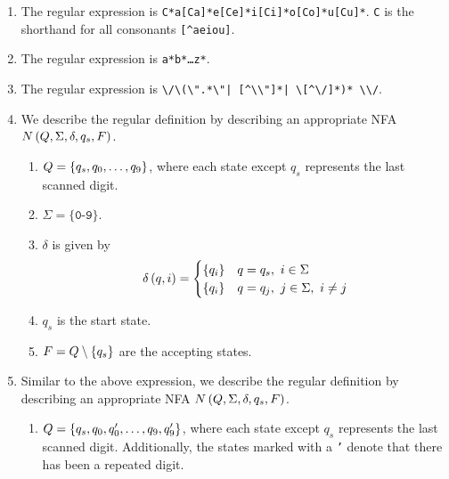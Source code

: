 \begin{solution}\label{sol:030305}
    \begin{enumerate}[label=\alph*)]
        \item The regular expression is \texttt{C*a[Ca]*e[Ce]*i[Ci]*o[Co]*u[Cu]*}.
        \texttt{C} is the shorthand for all consonants \texttt{[\^{}aeiou]}.
        \item The regular expression is \texttt{a*b*\dots z*}.
        \item The regular expression is \texttt{\textbackslash/\textbackslash*%
        (\textbackslash".*\textbackslash"|%
        [\^{}\textbackslash*\textbackslash"]*|%
        \textbackslash*[\^{}\textbackslash/]*)*%
        \textbackslash*\textbackslash/}.
        \item We describe the regular definition by describing an appropriate NFA
        $N\left( Q, \Sigma, \delta, q_s, F \right)$.
        \begin{enumerate}[label=\roman*)]
            \item $Q = \left\{ q_s, q_0, \ldots, q_9 \right\}$, where each state except $q_s$ 
            represents the last scanned digit.
            \item $\Sigma = \{\texttt{0-9}\}$.
            \item $\delta$ is given by
            \begin{align*}
                \delta\left( q, i \right) = 
                \begin{cases}
                    \left\{ q_i \right\} & q = q_s,\ i \in \Sigma \\
                    \left\{ q_i \right\} & q = q_j,\ j \in \Sigma,\ i \neq j
                \end{cases}
            \end{align*}
            \item $q_s$ is the start state.
            \item $F = Q \setminus \left\{ q_s \right\}$ are the accepting states.
        \end{enumerate}
        \item Similar to the above expression, we describe the regular definition 
        by describing an appropriate NFA $N\left( Q, \Sigma, \delta, q_s, F \right)$.
        \begin{enumerate}[label=\roman*)]
            \item $Q = \left\{ q_s, q_0, q_0', \ldots, q_9, q_9' \right\}$, where each state 
            except $q_s$ represents the last scanned digit. Additionally, the states
            marked with a \texttt{'} denote that there has been a repeated digit.

\end{enumerate}
\end{enumerate}
\end{solution}

